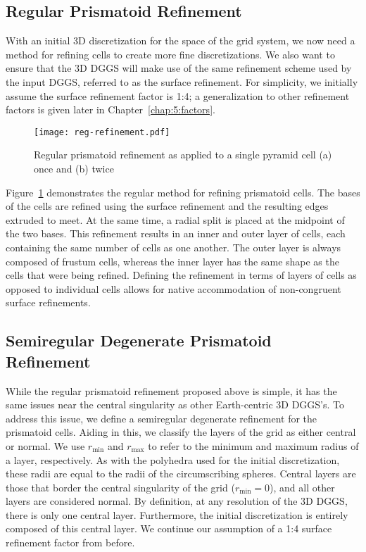\subsection{Regular Prismatoid Refinement} \label{chap:5:regular}
With an initial 3D discretization for the space of the grid system, we now need a method for refining cells to create more fine discretizations.
We also want to ensure that the 3D DGGS will make use of the same refinement scheme used by the input DGGS, referred to as the surface refinement.
For simplicity, we initially assume the surface refinement factor is 1:4; a generalization to other refinement factors is given later in Chapter~\ref{chap:5:factors}.


\begin{figure}[ht!]
	\centering
	\texttt{[image: reg-refinement.pdf]}
	\caption[Regular prismatoid refinement]{
		Regular prismatoid refinement as applied to a single pyramid cell (a) once and (b) twice
	}
	\label{fig:regular}
\end{figure}


Figure~\ref{fig:regular} demonstrates the regular method for refining prismatoid cells.
The bases of the cells are refined using the surface refinement and the resulting edges extruded to meet.
At the same time, a radial split is placed at the midpoint of the two bases.
This refinement results in an inner and outer layer of cells, each containing the same number of cells as one another.
The outer layer is always composed of frustum cells, whereas the inner layer has the same shape as the cells that were being refined.
Defining the refinement in terms of layers of cells as opposed to individual cells allows for native accommodation of non-congruent surface refinements.


\subsection{Semiregular Degenerate Prismatoid Refinement} \label{chap:5:semireg}
While the regular prismatoid refinement proposed above is simple, it has the same issues near the central singularity as other Earth-centric 3D DGGS's.
To address this issue, we define a semiregular degenerate refinement for the prismatoid cells.
Aiding in this, we classify the layers of the grid as either central or normal.
We use $r_\mathrm{min}$ and $r_\mathrm{max}$ to refer to the minimum and maximum radius of a layer, respectively.
As with the polyhedra used for the initial discretization, these radii are equal to the radii of the circumscribing spheres.
Central layers are those that border the central singularity of the grid ($r_\mathrm{min} = 0$), and all other layers are considered normal.
By definition, at any resolution of the 3D DGGS, there is only one central layer.
Furthermore, the initial discretization is entirely composed of this central layer.
We continue our assumption of a 1:4 surface refinement factor from before.


